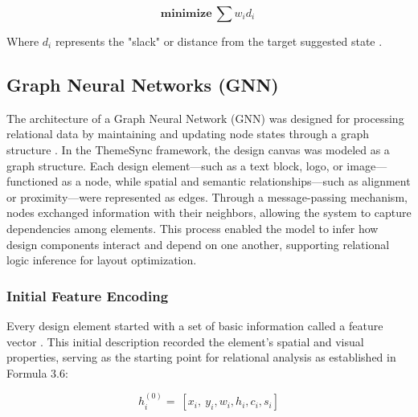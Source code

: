 \begin{refsection}
\begin{enumerate}
    \begin{center}
    \begin{minipage}{0.8\textwidth}
    \begin{equation}
    \mathbf{minimize}\ \sum w_id_i\ 
    \end{equation}
    \centering
    \end{minipage}
    \end{center}
	
	Where $d_i$ represents the "slack" or distance from the target suggested state \cite{Penco2025LLM}.
\end{enumerate}

\subsection{Graph Neural Networks (GNN)}
The architecture of a Graph Neural Network (GNN) was designed for processing relational data by maintaining and updating node states through a graph structure \cite{Wu2022GNN}. In the ThemeSync framework, the design canvas was modeled as a graph structure. Each design element—such as a text block, logo, or image—functioned as a node, while spatial and semantic relationships—such as alignment or proximity—were represented as edges. Through a message-passing mechanism, nodes exchanged information with their neighbors, allowing the system to capture dependencies among elements. This process enabled the model to infer how design components interact and depend on one another, supporting relational logic inference for layout optimization.

\subsubsection{Initial Feature Encoding}
Every design element started with a set of basic information called a feature vector \cite{Zhou2020Review}. This initial description recorded the element's spatial and visual properties, serving as the starting point for relational analysis as established in Formula 3.6:

\begin{center}
\begin{minipage}{0.8\textwidth}
\begin{equation}
h_i^{(0)}=\ [x_i,\ y_i,w_i,h_i,c_i,s_i] 
\end{equation}
\centering
\end{minipage}
\end{center}


\end{refsection}
